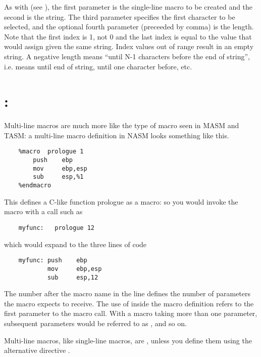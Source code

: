 As with  (see ), the first
parameter is the single-line macro to be created and the second
is the string. The third parameter specifies the first character
to be selected, and the optional fourth parameter (preceeded by comma)
is the length. Note that the first index is 1, not 0 and the last
index is equal to the value that  would assign given
the same string. Index values out of range result in an empty string.
A negative length means ``until N-1 characters before the end of string'',
i.e.  means until end of string,  until one character
before, etc.

\section{: }
\label{sec:mlmacro}

Multi-line macros are much more like the type of macro seen in MASM
and TASM: a multi-line macro definition in NASM looks something like
this.

\begin{lstlisting}
    %macro  prologue 1
        push    ebp
        mov     ebp,esp
        sub     esp,%1
    %endmacro
\end{lstlisting}

This defines a C-like function prologue as a macro: so you would
invoke the macro with a call such as

\begin{lstlisting}
    myfunc:   prologue 12
\end{lstlisting}

which would expand to the three lines of code

\begin{lstlisting}
    myfunc: push    ebp
            mov     ebp,esp
            sub     esp,12
\end{lstlisting}

The number  after the macro name in the  line
defines the number of parameters the macro  expects
to receive. The use of  inside the macro definition refers
to the first parameter to the macro call. With a macro taking more
than one parameter, subsequent parameters would be referred to as
,  and so on.

Multi-line macros, like single-line macros, are ,
unless you define them using the alternative directive .

